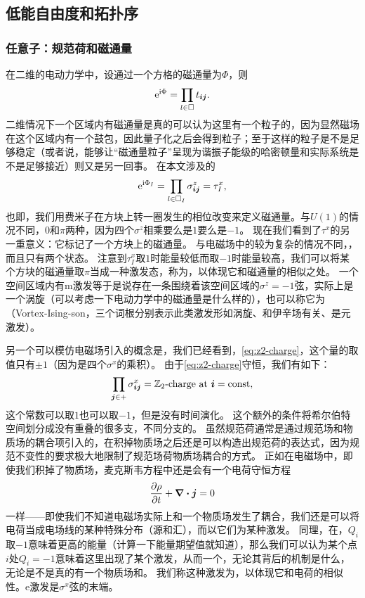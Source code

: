 \subsection{低能自由度和拓扑序}

\subsubsection{任意子：规范荷和磁通量}\label{sec:gauge-charge-flux-z2}

在二维的电动力学中，设通过一个方格的磁通量为$\Phi$，则
\[
    \mathrm{e}^{\mathrm{i} \Phi} = \prod_{l \in \Box} t_{\vb*{i} \vb*{j}}.
\]
二维情况下一个区域内有磁通量是真的可以认为这里有一个粒子的，因为显然磁场在这个区域内有一个鼓包，因此量子化之后会得到粒子；至于这样的粒子是不是足够稳定（或者说，能够让“磁通量粒子”呈现为谐振子能级的哈密顿量和实际系统是不是足够接近）则又是另一回事。
在本文涉及的
\begin{equation}
    \mathrm{e}^{\mathrm{i} \Phi_I} = \prod_{l \in \Box_I} {\sigma}^z_{\vb*{i} \vb*{j}} = {\tau}^x_I,
\end{equation}
也即，我们用费米子在方块上转一圈发生的相位改变来定义磁通量。与$U(1)$的情况不同，$0$和$\pi$两种，因为四个$\sigma^z$相乘要么是$1$要么是$-1$。
现在我们看到了${\tau}^x$的另一重意义：它标记了一个方块上的磁通量。
与电磁场中的较为复杂的情况不同，，而且只有两个状态。
注意到$\tau_I^x$取$1$时能量较低而取$-1$时能量较高，我们可以将某个方块的磁通量取$\pi$当成一种激发态，称为，以体现它和磁通量的相似之处。
一个空间区域内有m激发等于是说存在一条围绕着该空间区域的$\sigma^z=-1$弦，实际上是一个涡旋（可以考虑一下电动力学中的磁通量是什么样的），也可以称它为（Vortex-Ising-son，三个词根分别表示此类激发形如涡旋、和伊辛场有关、是元激发）。

另一个可以模仿电磁场引入的概念是，我们已经看到，\eqref{eq:z2-charge}，这个量的取值只有$\pm 1$（因为是四个$\sigma^x$的乘积）。
由于\eqref{eq:z2-charge}守恒，我们有如下：
\begin{equation}
    \prod_{\vb*{j} \in +} \sigma^x_{\vb*{i} \vb*{j}} = \text{$\mathbb{Z}_2$-charge at $\vb*{i}$} = \mathrm{const},
    \label{eq:gauss-z2}
\end{equation}
这个常数可以取$1$也可以取$-1$，但是没有时间演化。
这个额外的条件将希尔伯特空间划分成没有重叠的很多支，不同分支的。
虽然规范荷通常是通过规范场和物质场的耦合项引入的，在积掉物质场之后还是可以构造出规范荷的表达式，因为规范不变性的要求极大地限制了规范场荷物质场耦合的方式。
正如在电磁场中，即使我们积掉了物质场，麦克斯韦方程中还是会有一个电荷守恒方程
\[
    \pdv{\rho}{t} + \div{\vb*{j}} = 0
\]
一样——即使我们不知道电磁场实际上和一个物质场发生了耦合，我们还是可以将电荷当成电场线的某种特殊分布（源和汇），而以它们为某种激发。
同理，在，$Q_i$取$-1$意味着更高的能量（计算一下能量期望值就知道），那么我们可以认为某个点$i$处$Q_i=-1$意味着这里出现了某个激发，从而一个，无论其背后的机制是什么，无论是不是真的有一个物质场和。
我们称这种激发为，以体现它和电荷的相似性。e激发是$\sigma^x$弦的末端。

